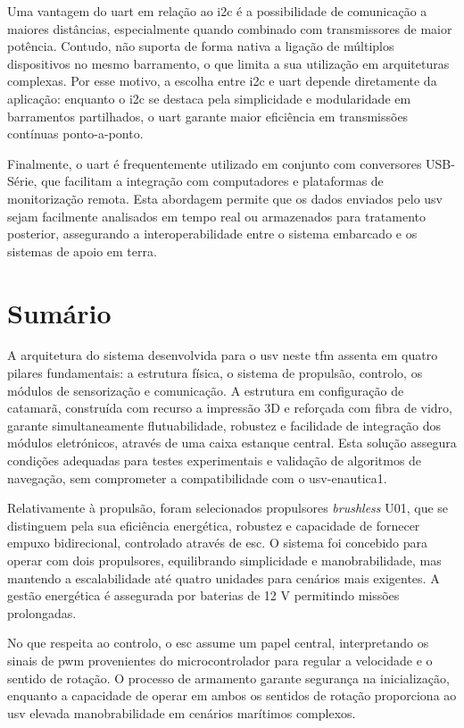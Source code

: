 Uma vantagem do \gls{uart} em relação ao \gls{i2c} é a possibilidade de comunicação a maiores distâncias, especialmente quando combinado com transmissores de maior potência. Contudo, não suporta de forma nativa a ligação de múltiplos dispositivos no mesmo barramento, o que limita a sua utilização em arquiteturas complexas. Por esse motivo, a escolha entre \gls{i2c} e \gls{uart} depende diretamente da aplicação: enquanto o \gls{i2c} se destaca pela simplicidade e modularidade em barramentos partilhados, o \gls{uart} garante maior eficiência em transmissões contínuas ponto-a-ponto.

Finalmente, o \gls{uart} é frequentemente utilizado em conjunto com conversores USB-Série, que facilitam a integração com computadores e plataformas de monitorização remota. Esta abordagem permite que os dados enviados pelo \gls{usv} sejam facilmente analisados em tempo real ou armazenados para tratamento posterior, assegurando a interoperabilidade entre o sistema embarcado e os sistemas de apoio em terra.


\section{Sumário}

A arquitetura do sistema desenvolvida para o \gls{usv} neste \gls{tfm} assenta em quatro pilares fundamentais: a estrutura física, o sistema de propulsão, controlo, os módulos de sensorização e comunicação. A estrutura em configuração de catamarã, construída com recurso a impressão 3D e reforçada com fibra de vidro, garante simultaneamente flutuabilidade, robustez e facilidade de integração dos módulos eletrónicos, através de uma caixa estanque central. Esta solução assegura condições adequadas para testes experimentais e validação de algoritmos de navegação, sem comprometer a compatibilidade com o \gls{usv}-enautica1.

Relativamente à propulsão, foram selecionados propulsores \emph{brushless} U01, que se distinguem pela sua eficiência energética, robustez e capacidade de fornecer empuxo bidirecional, controlado através de \gls{esc}. O sistema foi concebido para operar com dois propulsores, equilibrando simplicidade e manobrabilidade, mas mantendo a escalabilidade até quatro unidades para cenários mais exigentes. A gestão energética é assegurada por baterias de 12 V permitindo missões prolongadas.

No que respeita ao controlo, o \gls{esc} assume um papel central, interpretando os sinais de \gls{pwm} provenientes do microcontrolador para regular a velocidade e o sentido de rotação. O processo de armamento garante segurança na inicialização, enquanto a capacidade de operar em ambos os sentidos de rotação proporciona ao \gls{usv} elevada manobrabilidade em cenários marítimos complexos.

